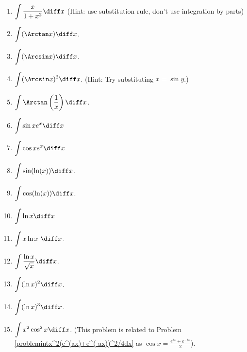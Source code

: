 \begin{multicols}{2}
\begin{enumerate}[ref={\fcProblemRef}]
\item $\displaystyle\int \frac{x}{1+x^2} \diff x$  (Hint: use substitution rule, don't use integration by parts)

\item \label{problemintarctanxdx}
$\displaystyle \int (\Arctan x) \diff x$.

\item 
$\displaystyle \int (\Arcsin x) \diff x
$.

\item \label{problemintArcsinSquared} $\displaystyle\int (\Arcsin x)^2 \diff x $. \quad \quad (Hint: Try substituting $x=\sin y$.)

\item 
$\displaystyle
\int\Arctan \left(\frac{1}x\right)\diff x
$.

\item \label{problemintsinxe^xdx} $\displaystyle \int \sin x e^x \diff x$

\item $\displaystyle \int \cos x e^x \diff x$

\item \label{problemintsin(ln x)dx}
$\displaystyle\int \sin (\ln (x)) \diff x $.

\item $\displaystyle\int \cos (\ln (x)) \diff x $.

\item \label{problemintlnxdx} $\displaystyle \int \ln x \diff x $

\item $\displaystyle \int x\ln x  ~ \diff x $.

\item \label{problemintlnx/sqrt(x)dx} $\displaystyle\int \frac{\ln x}{\sqrt{x}}\diff x $.

\item $\displaystyle\int (\ln x)^2 \diff x$.

\item $\displaystyle\int (\ln x)^3 \diff x$.

\item $\displaystyle\int x^2\cos^2x \diff x$. (This problem is related to Problem  \ref{problemintx^2(e^(ax)+e^(-ax))^2/4dx} as $\cos x= \frac{ e^{ix} + e^{-ix}}{2}$).
\end{enumerate}
\end{multicols}

